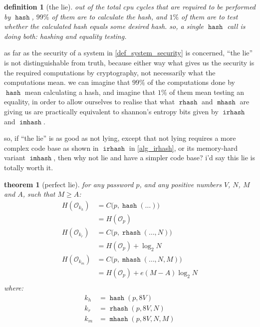 \documentclass[twocolumn]{article}
\newtheorem{definition}{definition}[section]
\newtheorem{theorem}{theorem}[section]
\DeclareMathOperator{\hash}{\mathtt{hash}}
\DeclareMathOperator{\rhash}{\mathtt{rhash}}
\DeclareMathOperator{\mhash}{\mathtt{mhash}}
\DeclareMathOperator{\irhash}{\mathtt{irhash}}
\DeclareMathOperator{\imhash}{\mathtt{imhash}}
\begin{document}
\begin{definition}[the lie]
    out of the total cpu cycles that are required to be performed by
    $\hash$, $99\%$ of them are to calculate the hash, and $1\%$ of them
    are to test whether the calculated hash equals some desired hash.  so,
    a single $\hash$ call is doing both: hashing and equality testing.
\end{definition}

as far as the security of a system in \cref{def_system_security} is
concerned, ``the lie'' is not distinguishable from truth, because either
way what gives us the security is the required computations by
cryptography, not necessarily what the computations mean.  we can imagine
that $99\%$ of the computations done by $\hash$ mean calculating a hash,
and imagine that $1\%$ of them mean testing an equality, in order to allow
ourselves to realise that what $\rhash$ and $\mhash$ are giving us are
practically equivalent to shannon's entropy bits given by $\irhash$ and
$\imhash$.

so, if ``the lie'' is as good as not lying, except that not lying requires
a more complex code base as shown in $\irhash$ in \cref{alg_irhash}, or its
memory-hard variant $\imhash$, then why not lie and have a simpler code
base?  i'd say this lie is totally worth it.

\begin{theorem}[perfect lie] \label{theorem_perfect_lie}
    for any password $p$, and any positive numbers $V$, $N$, $M$ and $A$,
    such that $M \ge A$:
    \[\begin{split}
        H(\mathcal{O}_{k_h}) 
            &= C\Big(p, \hash(\ldots)\Big) \\
            &= H(\mathcal{O}_p) \\
        H(\mathcal{O}_{k_r}) 
            &= C\Big(p, \rhash(\ldots, N)\Big) \\
            &= H(\mathcal{O}_p) + \log_2 N \\
        H(\mathcal{O}_{k_m}) 
            &= C\Big(p, \mhash(\ldots, N, M)\Big) \\
            &= H(\mathcal{O}_p) + e(M-A)\log_2 N \\
    \end{split}\]
    where:
    \[\begin{split}
        k_h &= \hash(p, 8V) \\
        k_r &= \rhash(p, 8V, N) \\
        k_m &= \mhash(p, 8V, N, M) \\
    \end{split}\]
\end{theorem}
\end{document}
